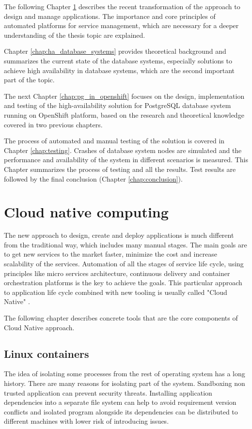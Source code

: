\documentclass[
  digital, %
  twoside, %
  table,   %
  lof,     %
  lot,     %
]{fithesis3}
\begin{document}
The following Chapter \ref{chap:cloud_native} describes the recent transformation of the approach to design and manage applications. The importance and core principles of automated platforms for service management, which are necessary for a deeper understanding of the thesis topic are explained.

Chapter \ref{chap:ha_database_systems} provides theoretical background and summarizes the current state of the database systems, especially solutions to achieve high availability in database systems, which are the second important part of the topic.

The next Chapter \ref{chap:pg_in_openshift} focuses on the design, implementation and testing of the high-availability solution for PostgreSQL database system running on OpenShift platform, based on the research and theoretical knowledge covered in two previous chapters.

The process of automated and manual testing of the solution is covered in Chapter \ref{chap:testing}. Crashes of database system nodes are simulated and the performance and availability of the system in different scenarios is measured. This Chapter summarizes the process of testing and all the results. Test results are followed by the final conclusion (Chapter \ref{chap:conclusion}).

\chapter{Cloud native computing} \label{chap:cloud_native}
The new approach to design, create and deploy applications is much different from the traditional way, which includes many manual stages. The main goals are to get new services to the market faster, minimize the cost and increase scalability of the services. Automation of all the stages of service life cycle, using principles like micro services architecture, continuous delivery and container orchestration platforms is the key to achieve the goals. This particular approach to application life cycle combined with new tooling is usually called "Cloud Native" \cite{cloud_native}.

The following chapter describes concrete tools that are the core components of Cloud Native approach.

\section{Linux containers} \label{sec:containers}
The idea of isolating some processes from the rest of operating system has a long history. There are many reasons for isolating part of the system. Sandboxing non trusted application can prevent security threats. Installing application dependencies into a separate file system can help to avoid requirement version conflicts and isolated program alongside its dependencies can be distributed to different machines with lower risk of introducing issues.
\end{document}
